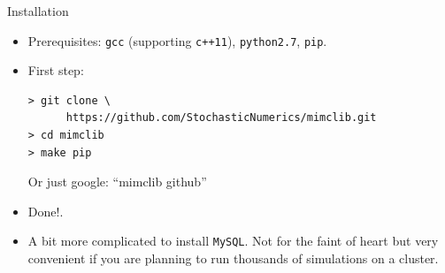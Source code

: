 
\begin{frame}[fragile]{Installation}
\begin{itemize}
  \item Prerequisites: \texttt{gcc} (supporting \texttt{c++11}), \texttt{python2.7}, \texttt{pip}.
  \item First step:
\begin{verbatim}
> git clone \
      https://github.com/StochasticNumerics/mimclib.git
> cd mimclib
> make pip
\end{verbatim}
    Or just google: ``mimclib github''
  \item Done!.
  \item A bit more complicated to install \texttt{MySQL}. Not for the
    faint of heart but very convenient if you are planning to run
    thousands of simulations on a cluster.
\end{itemize}
\end{frame}



